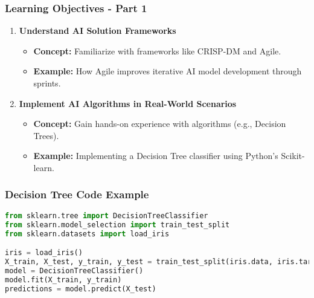 \documentclass[aspectratio=169]{beamer}
\begin{document}
\begin{frame}[fragile]
    \frametitle{Learning Objectives - Part 1}
    \begin{enumerate}
        \item \textbf{Understand AI Solution Frameworks}
            \begin{itemize}
                \item \textbf{Concept:} Familiarize with frameworks like CRISP-DM and Agile.
                \item \textbf{Example:} How Agile improves iterative AI model development through sprints.
            \end{itemize}
        
        \item \textbf{Implement AI Algorithms in Real-World Scenarios}
            \begin{itemize}
                \item \textbf{Concept:} Gain hands-on experience with algorithms (e.g., Decision Trees).
                \item \textbf{Example:} Implementing a Decision Tree classifier using Python's Scikit-learn.
            \end{itemize}
    \end{enumerate}
\end{frame}

\begin{frame}[fragile]
    \frametitle{Decision Tree Code Example}
    \begin{lstlisting}[language=Python]
from sklearn.tree import DecisionTreeClassifier
from sklearn.model_selection import train_test_split
from sklearn.datasets import load_iris

iris = load_iris()
X_train, X_test, y_train, y_test = train_test_split(iris.data, iris.target, test_size=0.2)
model = DecisionTreeClassifier()
model.fit(X_train, y_train)
predictions = model.predict(X_test)
    \end{lstlisting}
\end{frame}
\end{document}
